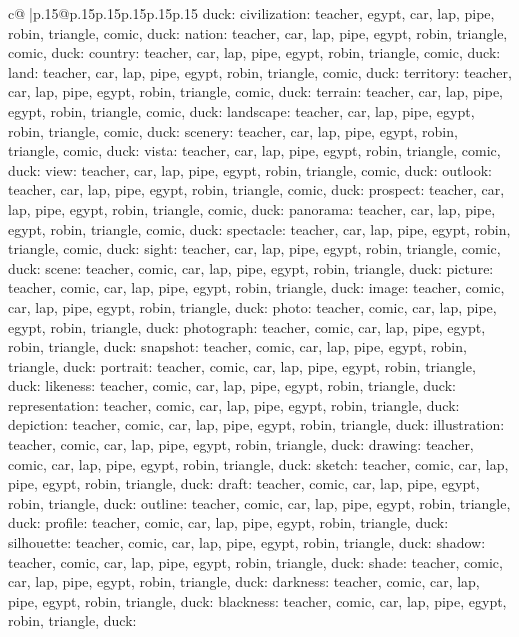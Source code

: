 \documentclass{article}
\begin{document}
{\begin{supertabular}{c@{$\;$}|p{.15\linewidth}@{}p{.15\linewidth}p{.15\linewidth}p{.15\linewidth}p{.15\linewidth}p{.15\linewidth}}
{{{duck\n\nCLUE: civilization\nTARGETS: teacher, egypt, car, lap, pipe, robin, triangle, comic, duck\n\nCLUE: nation\nTARGETS: teacher, car, lap, pipe, egypt, robin, triangle, comic, duck\n\nCLUE: country\nTARGETS: teacher, car, lap, pipe, egypt, robin, triangle, comic, duck\n\nCLUE: land\nTARGETS: teacher, car, lap, pipe, egypt, robin, triangle, comic, duck\n\nCLUE: territory\nTARGETS: teacher, car, lap, pipe, egypt, robin, triangle, comic, duck\n\nCLUE: terrain\nTARGETS: teacher, car, lap, pipe, egypt, robin, triangle, comic, duck\n\nCLUE: landscape\nTARGETS: teacher, car, lap, pipe, egypt, robin, triangle, comic, duck\n\nCLUE: scenery\nTARGETS: teacher, car, lap, pipe, egypt, robin, triangle, comic, duck\n\nCLUE: vista\nTARGETS: teacher, car, lap, pipe, egypt, robin, triangle, comic, duck\n\nCLUE: view\nTARGETS: teacher, car, lap, pipe, egypt, robin, triangle, comic, duck\n\nCLUE: outlook\nTARGETS: teacher, car, lap, pipe, egypt, robin, triangle, comic, duck\n\nCLUE: prospect\nTARGETS: teacher, car, lap, pipe, egypt, robin, triangle, comic, duck\n\nCLUE: panorama\nTARGETS: teacher, car, lap, pipe, egypt, robin, triangle, comic, duck\n\nCLUE: spectacle\nTARGETS: teacher, car, lap, pipe, egypt, robin, triangle, comic, duck\n\nCLUE: sight\nTARGETS: teacher, car, lap, pipe, egypt, robin, triangle, comic, duck\n\nCLUE: scene\nTARGETS: teacher, comic, car, lap, pipe, egypt, robin, triangle, duck\n\nCLUE: picture\nTARGETS: teacher, comic, car, lap, pipe, egypt, robin, triangle, duck\n\nCLUE: image\nTARGETS: teacher, comic, car, lap, pipe, egypt, robin, triangle, duck\n\nCLUE: photo\nTARGETS: teacher, comic, car, lap, pipe, egypt, robin, triangle, duck\n\nCLUE: photograph\nTARGETS: teacher, comic, car, lap, pipe, egypt, robin, triangle, duck\n\nCLUE: snapshot\nTARGETS: teacher, comic, car, lap, pipe, egypt, robin, triangle, duck\n\nCLUE: portrait\nTARGETS: teacher, comic, car, lap, pipe, egypt, robin, triangle, duck\n\nCLUE: likeness\nTARGETS: teacher, comic, car, lap, pipe, egypt, robin, triangle, duck\n\nCLUE: representation\nTARGETS: teacher, comic, car, lap, pipe, egypt, robin, triangle, duck\n\nCLUE: depiction\nTARGETS: teacher, comic, car, lap, pipe, egypt, robin, triangle, duck\n\nCLUE: illustration\nTARGETS: teacher, comic, car, lap, pipe, egypt, robin, triangle, duck\n\nCLUE: drawing\nTARGETS: teacher, comic, car, lap, pipe, egypt, robin, triangle, duck\n\nCLUE: sketch\nTARGETS: teacher, comic, car, lap, pipe, egypt, robin, triangle, duck\n\nCLUE: draft\nTARGETS: teacher, comic, car, lap, pipe, egypt, robin, triangle, duck\n\nCLUE: outline\nTARGETS: teacher, comic, car, lap, pipe, egypt, robin, triangle, duck\n\nCLUE: profile\nTARGETS: teacher, comic, car, lap, pipe, egypt, robin, triangle, duck\n\nCLUE: silhouette\nTARGETS: teacher, comic, car, lap, pipe, egypt, robin, triangle, duck\n\nCLUE: shadow\nTARGETS: teacher, comic, car, lap, pipe, egypt, robin, triangle, duck\n\nCLUE: shade\nTARGETS: teacher, comic, car, lap, pipe, egypt, robin, triangle, duck\n\nCLUE: darkness\nTARGETS: teacher, comic, car, lap, pipe, egypt, robin, triangle, duck\n\nCLUE: blackness\nTARGETS: teacher, comic, car, lap, pipe, egypt, robin, triangle, duck\n\nCLUE: }}}
\end{supertabular}}
\end{document}
